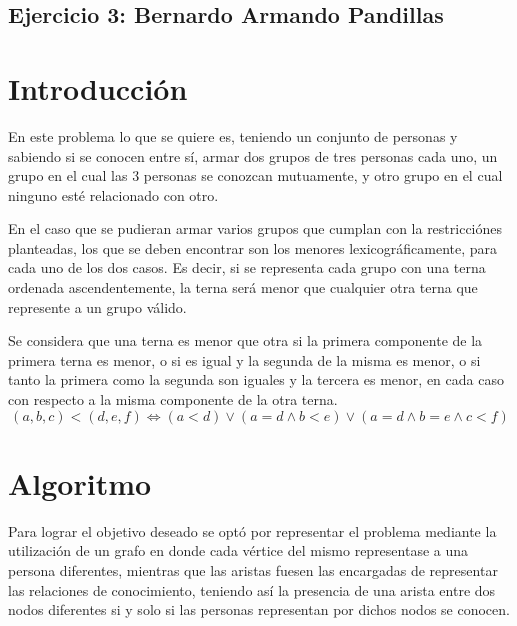 \documentclass[a4paper, 12pt]{article}
\begin{document}
\begin{center}
\item \section*{Ejercicio 3: Bernardo Armando Pandillas}
\end{center}

\section*{Introducci\'on}


En este problema lo que se quiere es, teniendo un conjunto de personas y sabiendo si se conocen entre s\'i, armar dos grupos de tres personas cada uno, un grupo en el cual las 3 personas se conozcan mutuamente, y otro grupo en el cual ninguno est\'e relacionado con otro.


En el caso que se pudieran armar varios grupos que cumplan con la restricci\'ones planteadas, los que se deben encontrar son los menores lexicogr\'aficamente, para cada uno de los dos casos. Es decir, si se representa cada grupo con una terna ordenada ascendentemente, la terna ser\'a menor que cualquier otra terna que represente a un grupo v\'alido.

Se considera que una terna es menor que otra si la primera componente de la primera terna es menor, o si es igual y la segunda de la misma es menor, o si tanto la primera como la segunda son iguales y la tercera es menor, en cada caso con respecto a la misma componente de la otra terna.
\begin{displaymath}
\left(a, b, c \right) < \left( d, e, f\right) \Leftrightarrow 
\left( a < d \right) \vee \left( a = d \wedge b < e \right) \vee \left( a = d \wedge b = e \wedge c < f \right)
\end{displaymath}


\section*{Algoritmo}

Para lograr el objetivo deseado se opt\'o por representar el problema mediante la utilizaci\'on de un grafo en donde cada v\'ertice del mismo representase a una persona diferentes, mientras que las aristas fuesen las encargadas de representar las relaciones de conocimiento, teniendo as\'i la presencia de una arista entre dos nodos diferentes si y solo si las personas representan por dichos nodos se conocen.
\end{document}
